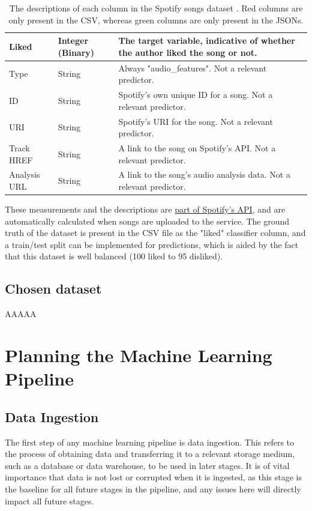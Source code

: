 \documentclass[12pt]{report}
\begin{document}
\begin{table}[H]
\begin{tabular}{ |p{}|p{}| p{}|}
            \hline
            \cellcolor{red!15}Liked & Integer (Binary) & The target variable, indicative of whether the author liked the song or not.\\
            \hline
            \cellcolor{green!15}Type & String & Always "audio\_features". Not a relevant predictor.\\
            \hline
            \cellcolor{green!15}ID & String & Spotify's own unique ID for a song. Not a relevant predictor.\\
            \hline
            \cellcolor{green!15}URI & String & Spotify's URI for the song. Not a relevant predictor.\\
            \hline
            \cellcolor{green!15}Track HREF & String & A link to the song on Spotify's API. Not a relevant predictor.\\  
            \hline
            \cellcolor{green!15}Analysis URL & String & A link to the song's audio analysis data. Not a relevant predictor. \\
            \hline
    \end{tabular}
    \caption{The descriptions of each column in the Spotify songs dataset \autocite{spotify_web_nodate}. Red columns are only present in the CSV, whereas green columns are only present in the JSONs.}\label{tab:Spotify-Types}
\end{table}

These measurements and the descriptions are \href{https://developer.spotify.com/documentation/web-api/reference/get-audio-features}{part of Spotify's API},
and are automatically calculated when songs are uploaded to the service. The ground truth of the dataset is present in the CSV file as the "liked" classifier 
column, and a train/test split can be implemented for predictions, which is aided by the fact that this dataset is well balanced (100 liked to 95 disliked).

\section{Chosen dataset}
AAAAA



\chapter{Planning the Machine Learning Pipeline}
\section{Data Ingestion}
The first step of any machine learning pipeline is data ingestion. This refers to the process of obtaining data and transferring 
it to a relevant storage medium, such as a database or data warehouse, to be used in later stages. It is of vital importance that 
data is not lost or corrupted when it is ingested, as this stage is the baseline for all future stages in the pipeline, and any issues
here will directly impact all future stages.

\printbibliography[keyword={Dataset}, title = {Datasets}]

\printbibliography
\end{document}
